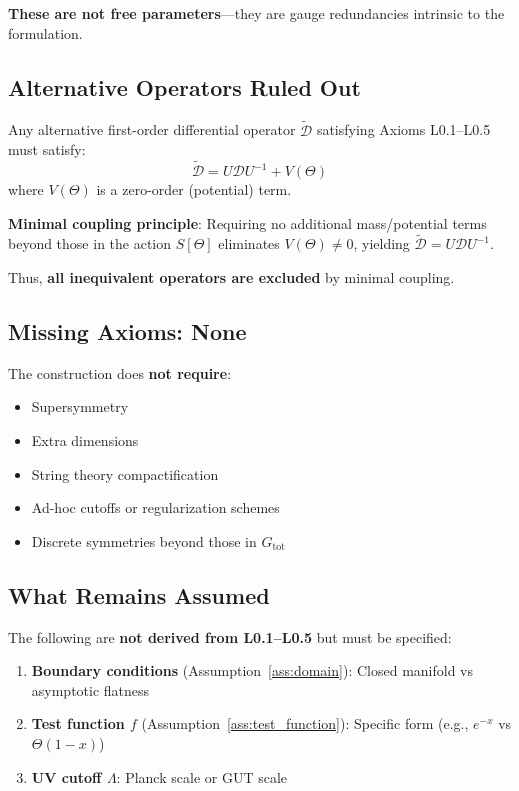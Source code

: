 \documentclass[12pt]{article}
\begin{document}
\textbf{These are not free parameters}—they are gauge redundancies intrinsic to the formulation.

\subsection{Alternative Operators Ruled Out}

Any alternative first-order differential operator $\tilde{\mathcal{D}}$ satisfying Axioms L0.1--L0.5 must satisfy:
\begin{equation}
\tilde{\mathcal{D}} = U \mathcal{D} U^{-1} + V(\Theta)
\end{equation}
where $V(\Theta)$ is a zero-order (potential) term.

\textbf{Minimal coupling principle}: Requiring no additional mass/potential terms beyond those in the action $S[\Theta]$ eliminates $V(\Theta) \neq 0$, yielding $\tilde{\mathcal{D}} = U \mathcal{D} U^{-1}$.

Thus, \textbf{all inequivalent operators are excluded} by minimal coupling.

\subsection{Missing Axioms: None}

The construction does \textbf{not require}:
\begin{itemize}
    \item Supersymmetry
    \item Extra dimensions
    \item String theory compactification
    \item Ad-hoc cutoffs or regularization schemes
    \item Discrete symmetries beyond those in $G_{\text{tot}}$
\end{itemize}

\subsection{What Remains Assumed}

The following are \textbf{not derived from L0.1--L0.5} but must be specified:
\begin{enumerate}
    \item \textbf{Boundary conditions} (Assumption~\ref{ass:domain}): Closed manifold vs asymptotic flatness
    \item \textbf{Test function $f$} (Assumption~\ref{ass:test_function}): Specific form (e.g., $e^{-x}$ vs $\Theta(1-x)$)
    \item \textbf{UV cutoff $\Lambda$}: Planck scale or GUT scale
\end{enumerate}
\end{document}

